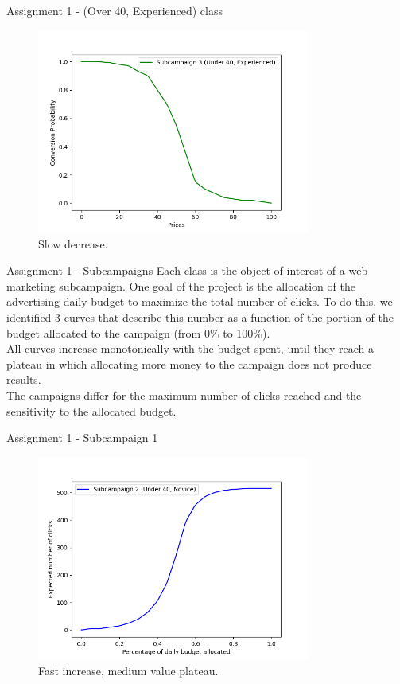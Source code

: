 \documentclass[11pt]{beamer}
\begin{document}
\begin{frame}{Assignment 1 - (Over 40, Experienced) class}
\begin{figure}[hbtp]
\centering
\includegraphics[width=0.8\textwidth]{images/demand_curve_3.png}
\caption{Slow decrease.}
\end{figure}
\end{frame}

\begin{frame}{Assignment 1 - Subcampaigns}
Each class is the object of interest of a web marketing subcampaign.
One goal of the project is the allocation of the advertising daily budget to maximize the total number of clicks. 
To do this, we identified 3 curves that describe this number as a function of the portion of the budget allocated to the campaign (from 0\% to 100\%).\\
All curves increase monotonically with the budget spent, until they reach a plateau in which allocating more money to the campaign does not produce results.\\
The campaigns differ for the maximum number of clicks reached and the sensitivity to the allocated budget.

\end{frame}

\begin{frame}{Assignment 1 - Subcampaign 1}
\begin{figure}[hbtp]
\centering
\includegraphics[width=0.8\textwidth]{images/subcampaign_2.png}
\caption{Fast increase, medium value plateau.}
\end{figure}
\end{frame}
\end{document}
